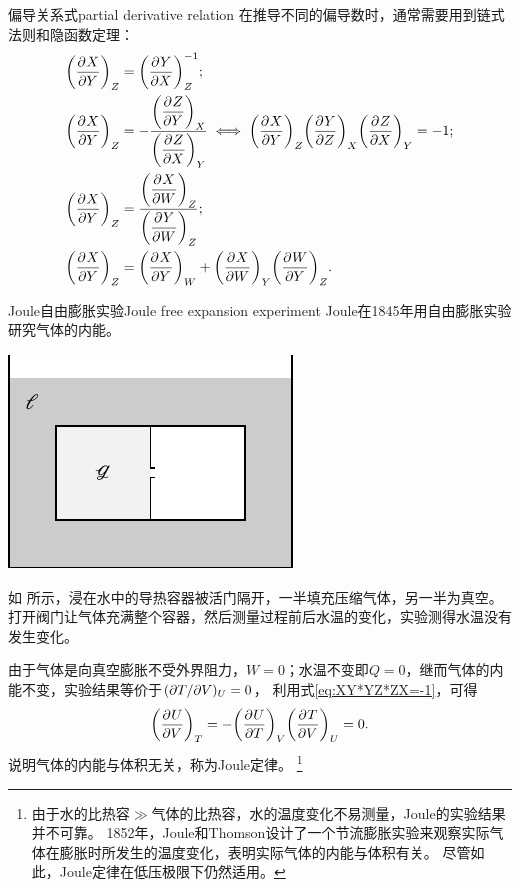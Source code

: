 \begin{theorem}
	{偏导关系式}{partial derivative relation}
	在推导不同的偏导数时，通常需要用到链式法则和隐函数定理：
	\begin{subequations}
		\begin{align}
			\label{eq:XY->YX}
			\pu[Z]XY&=\pu[Z]YX^{-1};\\
			\label{eq:XY*YZ*ZX=-1}
			\pu[Z]XY&=-\fracdisp{\pu[X]ZY}{\pu[Y]ZX}\iff\pu[Z]XY\pu[X]YZ\pu[Y]ZX=-1;\\
			\label{eq:XY->XW/YW}
			\pu[Z]XY&=\fracdisp{\pu[Z]XW}{\pu[Z]YW};\\
			\label{eq:XY->XY+XW*WY}
			\pu[Z]XY&=\pu[W]XY+\pu[Y]XW\pu[Z]WY.
		\end{align}
	\end{subequations}
\end{theorem}

\begin{example}
	{Joule自由膨胀实验}{Joule free expansion experiment}
	Joule在1845年用自由膨胀实验研究气体的内能。
	\begin{center}
		\includegraphics[page=1]{figures/tikz/layouts.pdf}
		\label{fig:Joule free expansion}
	\end{center}
	如 所示，浸在水中的导热容器被活门隔开，一半填充压缩气体，另一半为真空。打开阀门让气体充满整个容器，然后测量过程前后水温的变化，实验测得水温没有发生变化。

	由于气体是向真空膨胀不受外界阻力，$W=0$；水温不变即$Q=0$，继而气体的内能不变，实验结果等价于$(\p T/\p V)_U=0$，
	利用式\eqref{eq:XY*YZ*ZX=-1}，可得
	\[
		\pu[T]UV=-\pu[V]UT\pu[U]TV=0.
	\]
	说明气体的内能与体积无关，称为Joule定律。
	\footnote{
		由于水的比热容$\gg$气体的比热容，水的温度变化不易测量，Joule的实验结果并不可靠。
		1852年，Joule和Thomson设计了一个节流膨胀实验来观察实际气体在膨胀时所发生的温度变化，表明实际气体的内能与体积有关。
		尽管如此，Joule定律在低压极限下仍然适用。
	}
\end{example}

